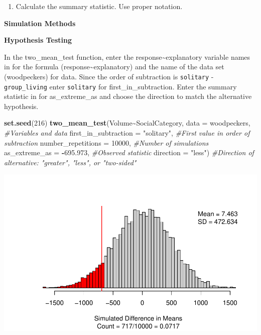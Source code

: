 \documentclass[
]{report}
\newenvironment{Shaded}{\begin{snugshade}}{\end{snugshade}}
\newcommand{\AttributeTok}[1]{\textcolor[rgb]{0.13,0.29,0.53}{#1}}
\newcommand{\CommentTok}[1]{\textcolor[rgb]{0.56,0.35,0.01}{\textit{#1}}}
\newcommand{\DecValTok}[1]{\textcolor[rgb]{0.00,0.00,0.81}{#1}}
\newcommand{\FloatTok}[1]{\textcolor[rgb]{0.00,0.00,0.81}{#1}}
\newcommand{\FunctionTok}[1]{\textcolor[rgb]{0.13,0.29,0.53}{\textbf{#1}}}
\newcommand{\NormalTok}[1]{#1}
\newcommand{\SpecialCharTok}[1]{\textcolor[rgb]{0.81,0.36,0.00}{\textbf{#1}}}
\newcommand{\StringTok}[1]{\textcolor[rgb]{0.31,0.60,0.02}{#1}}
\providecommand{\tightlist}{%
  \setlength{\itemsep}{0pt}\setlength{\parskip}{0pt}}
\begin{document}
\vspace{0.5in}

\begin{enumerate}
\def\labelenumi{\arabic{enumi}.}
\setcounter{enumi}{3}
\tightlist
\item
  Calculate the summary statistic. Use proper notation.
\end{enumerate}

\vspace{0.5in}

\textbf{Simulation Methods}

\textbf{Hypothesis Testing}

In the two\_mean\_test function, enter the response\textasciitilde explanatory variable names in for the formula (response\textasciitilde explanatory) and the name of the data set (woodpeckers) for data. Since the order of subtraction is \texttt{solitary} - \texttt{group\_living} enter \texttt{solitary} for first\_in\_subtraction. Enter the summary statistic in for as\_extreme\_as and choose the direction to match the alternative hypothesis.

\begin{Shaded}
\begin{Highlighting}[]
\FunctionTok{set.seed}\NormalTok{(}\DecValTok{216}\NormalTok{)}
\FunctionTok{two\_mean\_test}\NormalTok{(Volume}\SpecialCharTok{\textasciitilde{}}\NormalTok{SocialCategory, }\AttributeTok{data =}\NormalTok{ woodpeckers,  }\CommentTok{\#Variables and data}
                    \AttributeTok{first\_in\_subtraction =} \StringTok{"solitary"}\NormalTok{, }\CommentTok{\#First value in order of subtraction}
                    \AttributeTok{number\_repetitions =} \DecValTok{10000}\NormalTok{,  }\CommentTok{\#Number of simulations}
                    \AttributeTok{as\_extreme\_as =} \SpecialCharTok{{-}}\FloatTok{695.973}\NormalTok{, }\CommentTok{\#Observed statistic}
                    \AttributeTok{direction =} \StringTok{"less"}\NormalTok{)  }\CommentTok{\#Direction of alternative: "greater", "less", or "two{-}sided"}
\end{Highlighting}
\end{Shaded}

\begin{center}\includegraphics[width=0.7\linewidth]{14-UR-module12_review_files/figure-latex/unnamed-chunk-3-1} \end{center}
\end{document}
